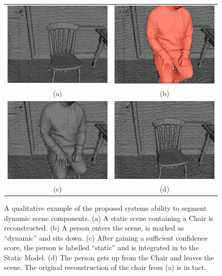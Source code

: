 \begin{figure}[ht]
  \label{fig:moseg_qualitative_chair}
  \centering
  \begin{tabular}{cc}
    \includegraphics[height=.25\linewidth]{figures/moseg/chair0.png} &
    \includegraphics[height=.25\linewidth]{figures/moseg/chair1.png} \\
    (a) & (b) \\
    \includegraphics[height=.25\linewidth]{figures/moseg/chair2.png} &
    \includegraphics[height=.25\linewidth]{figures/moseg/chair3.png} \\
    (c) & (d)
  \end{tabular}
  \caption[Motion Segmentation Qualitative Results II]
  {A qualitative example of the proposed systems ability to segment
    dynamic scene components.
    (a) A static scene containing a Chair is reconstructed.
    (b) A person enters the scene, is marked as ``dynamic'' and sits down.
    (c) After gaining a sufficient confidence score, the person is labelled
    ``static'' and is integrated in to the Static Model.
    (d) The person gets up from the Chair and leaves the scene. The original
    reconstruction of the chair from (a) is in tact.}
\end{figure}

